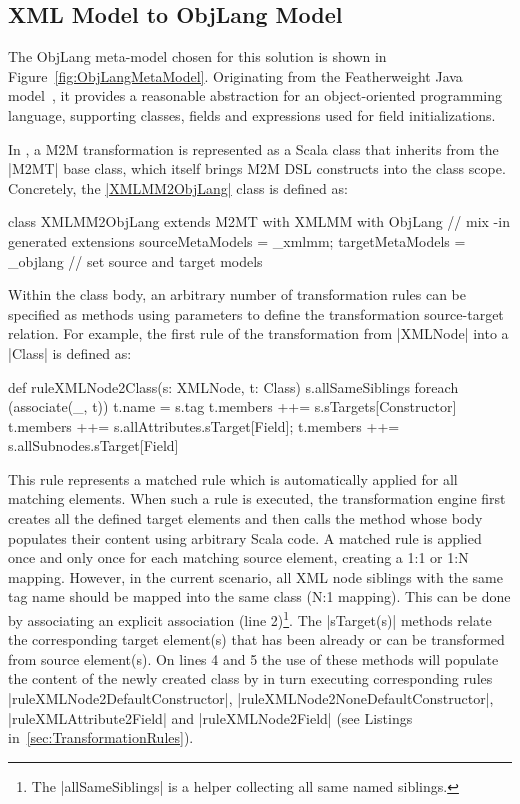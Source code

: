 \subsection{XML Model to ObjLang Model}

The ObjLang meta-model chosen for this solution is shown in Figure~\ref{fig:ObjLangMetaModel}.
Originating from the Featherweight Java model~\cite{Igarashi2001}, it provides a reasonable abstraction for an object-oriented programming language, supporting classes, fields and expressions used for field initializations.

In \SIGMA, a M2M transformation is represented as a Scala class that inherits from the \Scala|M2MT| base class, which itself brings M2M DSL constructs into the class scope.
Concretely, the \href{https://github.com/fikovnik/ttc14-fixml-sigma/blob/master/ttc14-fixml-base/src/fr/inria/spirals/sigma/ttc14/fixml/XMLMM2ObjLang.scala}{\Scala|XMLMM2ObjLang|} class is defined as:
%
\begin{scalacode}
class XMLMM2ObjLang extends M2MT with XMLMM with ObjLang { // mix -in generated extensions
  sourceMetaModels = _xmlmm; targetMetaModels = _objlang // set source and target models
}  
\end{scalacode}
%
Within the class body, an arbitrary number of transformation rules can be specified as methods using parameters to define the transformation source-target relation.
For example, the first rule of the transformation from \Scala|XMLNode| into a \Scala|Class| is defined as:
%
\begin{scalacode}
def ruleXMLNode2Class(s: XMLNode, t: Class) {
  s.allSameSiblings foreach (associate(_, t))
  t.name = s.tag
  t.members ++= s.sTargets[Constructor]
  t.members ++= s.allAttributes.sTarget[Field]; t.members ++= s.allSubnodes.sTarget[Field]
}
\end{scalacode}
%
This rule represents a matched rule which is automatically applied for all matching elements.
When such a rule is executed, the transformation engine first creates all the defined target elements and then calls the method whose body populates their content using arbitrary Scala code.
A matched rule is applied once and only once for each matching source element, creating a 1:1 or 1:N mapping.
However, in the current scenario, all XML node siblings with the same tag name should be mapped into the same class (N:1 mapping).
This can be done by associating an explicit association (line 2)\footnote{The \Scala|allSameSiblings| is a helper collecting all same named siblings.}.
%
The \Scala|sTarget(s)| methods relate the corresponding target element(s) that has been already or can be transformed from source element(s).
On lines 4 and 5 the use of these methods will populate the content of the newly created class by in turn executing corresponding rules \Scala|ruleXMLNode2DefaultConstructor|, \Scala|ruleXMLNode2NoneDefaultConstructor|, \Scala|ruleXMLAttribute2Field| and \Scala|ruleXMLNode2Field| (see Listings in~\ref{sec:TransformationRules}).

